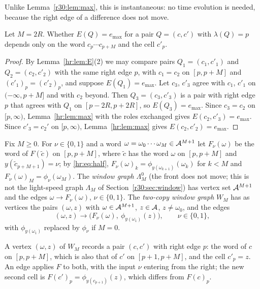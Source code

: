 Unlike Lemma~\ref{r30:lem:max}, this is instantaneous: no time evolution is needed, because the right edge of a difference does not move.

\begin{corollary}\label{hr:cor:word}
Let $M=2R$. Whether $E(Q)=e_{\max}$ for a pair $Q=(c,c')$ with $\lambda(Q)=p$ depends only on the word $c_p\cdots c_{p+M}$ and the cell $c'_p$.
\end{corollary}

\begin{proof}
By Lemma~\ref{hr:lem:E}(2) we may compare pairs $Q_1=(c_1,c'_1)$ and $Q_2=(c_2,c'_2)$ with the same right edge $p$, with $c_1=c_2$ on $[p,p+M]$ and $(c'_1)_p=(c'_2)_p$, and suppose $E(Q_1)=e_{\max}$. Let $c_3$, $c'_3$ agree with $c_1$, $c'_1$ on $(-\infty,p+M]$ and with $c_2$ beyond. Then $Q_3=(c_3,c'_3)$ is a pair with right edge $p$ that agrees with $Q_1$ on $[p-2R,p+2R]$, so $E(Q_3)=e_{\max}$. Since $c_3=c_2$ on $[p,\infty)$, Lemma~\ref{hr:lem:max} with the roles exchanged gives $E(c_2,c'_3)=e_{\max}$. Since $c'_3=c_2'$ on $[p,\infty)$, Lemma~\ref{hr:lem:max} gives $E(c_2,c'_2)=e_{\max}$.
\end{proof}

\begin{definition}\label{hr:def:graphs}
Fix $M\ge0$. For $\nu\in\{0,1\}$ and a word $\omega=\omega_0\cdots\omega_M\in\mathcal{A}^{M+1}$ let $F_\nu(\omega)$ be the word of $F(\tilde c)$ on $[p,p+M]$, where $\tilde c$ has the word $\omega$ on $[p,p+M]$ and $y(\tilde c_{p+M+1})=\nu$; by \eqref{hr:eq:half}, $F_\nu(\omega)_k=\phi_{y(\omega_{k+1})}(\omega_k)$ for $k<M$ and $F_\nu(\omega)_M=\phi_\nu(\omega_M)$. The \emph{window graph} $\Lambda^0_M$ (the front does not move; this is not the light-speed graph $\Lambda_M$ of Section~\ref{r30:sec:window}) has vertex set $\mathcal{A}^{M+1}$ and the edges $\omega\to F_\nu(\omega)$, $\nu\in\{0,1\}$. The \emph{two-copy window graph} $W_M$ has as vertices the pairs $(\omega,z)$ with $\omega\in\mathcal{A}^{M+1}$, $z\in\mathcal{A}$, $z\ne\omega_0$, and the edges
\[
(\omega,z)\longrightarrow\bigl(F_\nu(\omega),\ \phi_{y(\omega_1)}(z)\bigr),\qquad \nu\in\{0,1\},
\]
with $\phi_{y(\omega_1)}$ replaced by $\phi_\nu$ if $M=0$.
\end{definition}

A vertex $(\omega,z)$ of $W_M$ records a pair $(c,c')$ with right edge $p$: the word of $c$ on $[p,p+M]$, which is also that of $c'$ on $[p+1,p+M]$, and the cell $c'_p=z$. An edge applies $F$ to both, with the input $\nu$ entering from the right; the new second cell is $F(c')_p=\phi_{y(c_{p+1})}(z)$, which differs from $F(c)_p$.

